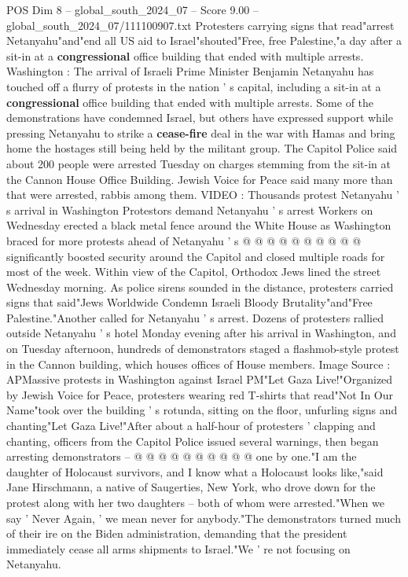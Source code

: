 \begin{textsample}{POS Dim 8 – global\_south\_2024\_07 – Score 9.00 – global\_south\_2024\_07/111100907.txt}  \label{ex:f8_pos_110}
Protesters carrying signs that read"arrest Netanyahu"and"end all US aid to Israel"shouted"Free, free Palestine,"a day after a sit-in at a \textbf{congressional} office building that ended with multiple arrests.
Washington : The arrival of Israeli Prime Minister Benjamin Netanyahu has touched off a flurry of protests in the nation ' s capital, including a sit-in at a \textbf{congressional} office building that ended with multiple arrests.
Some of the demonstrations have condemned Israel, but others have expressed support while pressing Netanyahu to strike a \textbf{cease-fire} deal in the war with Hamas and bring home the hostages still being held by the militant group.
The Capitol Police said about 200 people were arrested Tuesday on charges stemming from the sit-in at the Cannon House Office Building.
Jewish Voice for Peace said many more than that were arrested, rabbis among them.
VIDEO : Thousands protest Netanyahu ' s arrival in Washington Protestors demand Netanyahu ' s arrest Workers on Wednesday erected a black metal fence around the White House as Washington braced for more protests ahead of Netanyahu ' s @ @ @ @ @ @ @ @ @ @ significantly boosted security around the Capitol and closed multiple roads for most of the week.
Within view of the Capitol, Orthodox Jews lined the street Wednesday morning.
As police sirens sounded in the distance, protesters carried signs that said"Jews Worldwide Condemn Israeli Bloody Brutality"and"Free Palestine."Another called for Netanyahu ' s arrest.
Dozens of protesters rallied outside Netanyahu ' s hotel Monday evening after his arrival in Washington, and on Tuesday afternoon, hundreds of demonstrators staged a flashmob-style protest in the Cannon building, which houses offices of House members.
Image Source : APMassive protests in Washington against Israel PM"Let Gaza Live!"Organized by Jewish Voice for Peace, protesters wearing red T-shirts that read"Not In Our Name"took over the building ' s rotunda, sitting on the floor, unfurling signs and chanting"Let Gaza Live!"After about a half-hour of protesters ' clapping and chanting, officers from the Capitol Police issued several warnings, then began arresting demonstrators -- @ @ @ @ @ @ @ @ @ @ one by one."I am the daughter of Holocaust survivors, and I know what a Holocaust looks like,"said Jane Hirschmann, a native of Saugerties, New York, who drove down for the protest along with her two daughters -- both of whom were arrested."When we say ' Never Again, ' we mean never for anybody."The demonstrators turned much of their ire on the Biden administration, demanding that the president immediately cease all arms shipments to Israel."We ' re not focusing on Netanyahu.

\end{textsample}
